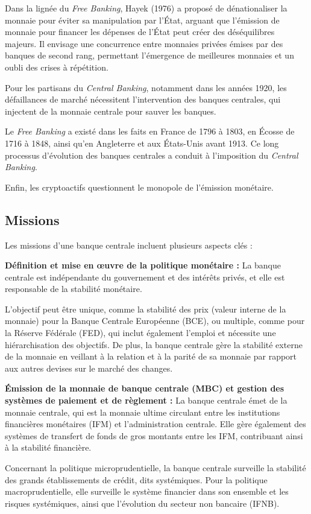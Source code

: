 \documentclass[a4paper, 12pt]{report}
\begin{document}
Dans la lignée du \textit{Free Banking}, Hayek (1976) a proposé de dénationaliser la monnaie pour éviter sa manipulation par l'État, arguant que l'émission de monnaie pour financer les dépenses de l'État peut créer des déséquilibres majeurs. Il envisage une concurrence entre monnaies privées émises par des banques de second rang, permettant l'émergence de meilleures monnaies et un oubli des crises à répétition.

Pour les partisans du \textit{Central Banking}, notamment dans les années 1920, les défaillances de marché nécessitent l'intervention des banques centrales, qui injectent de la monnaie centrale pour sauver les banques.

Le \textit{Free Banking} a existé dans les faits en France de 1796 à 1803, en Écosse de 1716 à 1848, ainsi qu'en Angleterre et aux États-Unis avant 1913. Ce long processus d'évolution des banques centrales a conduit à l'imposition du \textit{Central Banking}.

Enfin, les cryptoactifs questionnent le monopole de l'émission monétaire.
\subsection{Missions}

Les missions d'une banque centrale incluent plusieurs aspects clés :

\textbf{Définition et mise en œuvre de la politique monétaire :} La banque centrale est indépendante du gouvernement et des intérêts privés, et elle est responsable de la stabilité monétaire.

L'objectif peut être unique, comme la stabilité des prix (valeur interne de la monnaie) pour la Banque Centrale Européenne (BCE), ou multiple, comme pour la Réserve Fédérale (FED), qui inclut également l'emploi et nécessite une hiérarchisation des objectifs. De plus, la banque centrale gère la stabilité externe de la monnaie en veillant à la relation et à la parité de sa monnaie par rapport aux autres devises sur le marché des changes.

\textbf{Émission de la monnaie de banque centrale (MBC) et gestion des systèmes de paiement et de règlement :} La banque centrale émet de la monnaie centrale, qui est la monnaie ultime circulant entre les institutions financières monétaires (IFM) et l'administration centrale. Elle gère également des systèmes de transfert de fonds de gros montants entre les IFM, contribuant ainsi à la stabilité financière.

Concernant la politique microprudentielle, la banque centrale surveille la stabilité des grands établissements de crédit, dits systémiques. Pour la politique macroprudentielle, elle surveille le système financier dans son ensemble et les risques systémiques, ainsi que l'évolution du secteur non bancaire (IFNB).
\end{document}
